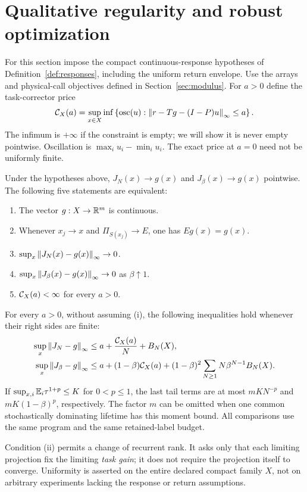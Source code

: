 \section{Qualitative regularity and robust optimization}\label{sec:transfer}
For this section impose the compact continuous-response hypotheses of Definition~\ref{def:responses}, including the uniform return envelope. Use the arrays and physical-call objectives defined in Section~\ref{sec:modulus}.
For $a>0$ define the task-corrector price
\begin{equation}\label{eq:corrector-price}
 \mathcal C_X(a)=\sup_{x\in X}\inf\left\{\operatorname{osc}(u):
  \left\lVert r-Tg-(I-P)u\right\rVert_\infty\le a\right\}.
\end{equation}
The infimum is $+\infty$ if the constraint is empty; we will show it is never empty pointwise. Oscillation is $\max_i u_i-\min_i u_i$. The exact price at $a=0$ need not be uniformly finite.

\begin{theorem}\label{thm:transfer}
Under the hypotheses above, $J_N(x)\to g(x)$ and $J_\beta(x)\to g(x)$ pointwise. The following five statements are equivalent:
\begin{enumerate}
\item[(i)] The vector $g:X\to\mathbb R^m$ is continuous.
\item[(ii)] Whenever $x_j\to x$ and $\Pi_{S(x_j)}\to E$, one has $Eg(x)=g(x)$.
\item[(iii)] $\sup_x\left\lVert J_N(x)-g(x)\right\rVert_\infty\to0$.
\item[(iv)] $\sup_x\left\lVert J_\beta(x)-g(x)\right\rVert_\infty\to0$ as $\beta\uparrow1$.
\item[(v)] $\mathcal C_X(a)<\infty$ for every $a>0$.
\end{enumerate}
For every $a>0$, without assuming (i), the following inequalities hold whenever their right sides are finite:
\begin{align}
 \sup_x\left\lVert J_N-g\right\rVert_\infty
 &\le a+\frac{\mathcal C_X(a)}{N}+B_N(X),\label{eq:physical-bound}\\
 \sup_x\left\lVert J_\beta-g\right\rVert_\infty
 &\le a+(1-\beta)\mathcal C_X(a)
 +(1-\beta)^2\sum_{N\ge1}N\beta^{N-1}B_N(X).\label{eq:discount-bound}
\end{align}
If $\sup_{x,i}\mathbb E_i\tau^{1+p}\le K$ for $0<p\le1$, the last tail terms are at most $mKN^{-p}$ and $mK(1-\beta)^p$, respectively. The factor $m$ can be omitted when one common stochastically dominating lifetime has this moment bound. All comparisons use the same program and the same retained-label budget.
\end{theorem}
Condition (ii) permits a change of recurrent rank. It asks only that each limiting projection fix the limiting \emph{task gain}; it does not require the projection itself to converge. Uniformity is asserted on the entire declared compact family $X$, not on arbitrary experiments lacking the response or return assumptions.

